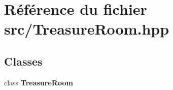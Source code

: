 \section{Référence du fichier src/\-Treasure\-Room.hpp}
\label{_treasure_room_8hpp}
\subsection*{Classes}
\begin{DoxyCompactItemize}
\item 
class {\bf Treasure\-Room}
\end{DoxyCompactItemize}
